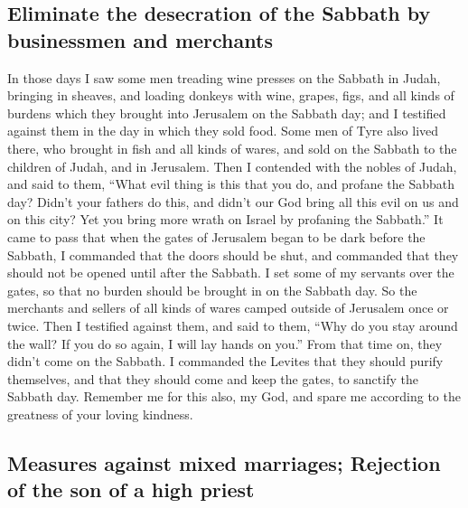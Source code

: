 \hypertarget{eliminate-the-desecration-of-the-sabbath-by-businessmen-and-merchants}{%
\subsection{Eliminate the desecration of the Sabbath by businessmen and
merchants}\label{eliminate-the-desecration-of-the-sabbath-by-businessmen-and-merchants}}

 In those days I saw some men treading wine presses on
the Sabbath in Judah, bringing in sheaves, and loading donkeys with
wine, grapes, figs, and all kinds of burdens which they brought into
Jerusalem on the Sabbath day; and I testified against them in the day in
which they sold food.  Some men of Tyre also lived there,
who brought in fish and all kinds of wares, and sold on the Sabbath to
the children of Judah, and in Jerusalem.  Then I
contended with the nobles of Judah, and said to them, ``What evil thing
is this that you do, and profane the Sabbath day?  Didn't
your fathers do this, and didn't our God bring all this evil on us and
on this city? Yet you bring more wrath on Israel by profaning the
Sabbath.''  It came to pass that when the gates of
Jerusalem began to be dark before the Sabbath, I commanded that the
doors should be shut, and commanded that they should not be opened until
after the Sabbath. I set some of my servants over the gates, so that no
burden should be brought in on the Sabbath day.  So the
merchants and sellers of all kinds of wares camped outside of Jerusalem
once or twice.  Then I testified against them, and said
to them, ``Why do you stay around the wall? If you do so again, I will
lay hands on you.'' From that time on, they didn't come on the Sabbath.
 I commanded the Levites that they should purify
themselves, and that they should come and keep the gates, to sanctify
the Sabbath day. Remember me for this also, my God, and spare me
according to the greatness of your loving kindness.

\hypertarget{measures-against-mixed-marriages-rejection-of-the-son-of-a-high-priest}{%
\subsection{Measures against mixed marriages; Rejection of the son of a
high
priest}\label{measures-against-mixed-marriages-rejection-of-the-son-of-a-high-priest}}

